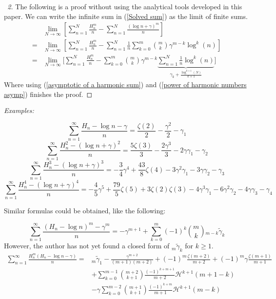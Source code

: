 \documentclass{article}
\newcommand{\pHz}[2]{\mathcal{H}^{#1}(#2)}
\begin{document}
\begin{proof} [\proofname\ 2] The following is a proof without using the analytical tools developed in this paper. We can write the infinite sum in (\ref{Solved sum}) as the limit of finite sums.
    \begin{equation*}\begin{split}&
\lim_{N\to\infty}\left[\sum_{n=1}^N\frac{H^m_n}{n}-\sum_{n=1}^N\frac{(\log n+\gamma)^m}{n}\right]\\ =& \lim_{N\to\infty}\left[\sum_{n=1}^N\frac{H^m_n}{n}-\sum_{n=1}^N\frac{1}{n}\sum_{k=0}^m\binom{m}{k}\gamma^{m-k}\log^k(n)\right] \\
= & \lim_{N\to\infty}\Bigg[\sum_{n=1}^N\frac{H^m_n}{n}-\sum_{k=0}^m\binom{m}{k}\gamma^{m-k}{\underbrace{\sum_{n=1}^N\frac{1}{n}\log^k(n)}_{\gamma_k+\frac{\log^{k+1}(N)}{k+1}}}\Bigg]
\end{split}\end{equation*}
Where using (\ref{asymptotic of a harmonic sum}) and (\ref{power of harmonic numbers asymp}) finishes the proof.
\end{proof}



\textit{Examples:}

$$ \sum_{n=1}^{\infty}\frac{H_n-\log n-\gamma}{n}=\frac{\zeta(2)}{2}-\frac{\gamma^2}{2}-\gamma_1$$
$$ \sum_{n=1}^{\infty}\frac{H_n^2-(\log n+\gamma)^2}{n}=\frac{5\zeta(3)}{3}-\frac{2\gamma^3}{3}-2\gamma\gamma_1-\gamma_2$$
$$ \sum_{n=1}^{\infty}\frac{H_n^3-(\log n+\gamma)^3}{n}=-\frac{3}{4}\gamma^4+\frac{43}{8}\zeta(4)-3\gamma^2\gamma_1-3\gamma\gamma_2-\gamma_3$$
$$ \sum_{n=1}^{\infty}\frac{H_n^4-(\log n+\gamma)^4}{n}=-\frac{4}{5}\gamma^5+\frac{79}{5}\zeta(5)+3\zeta(2)\zeta(3)-4\gamma^3\gamma_1-6\gamma^2\gamma_2-4\gamma\gamma_3-\gamma_4$$


Similar formulas could be obtained, like the following:

\begin{equation}
    \sum_{n=1}^{\infty}\frac{(H_n-\log n)^m -\gamma^m}{n}=-\gamma^{m+1}+\sum_{k=0}^{m}(-1)^k\binom{m}{k}{}_{m-k}\tilde\gamma_k
\end{equation}
However, the author has not yet found a closed form of ${}_m\tilde \gamma_k $ for $k\geq 1$.
\begin{equation}\begin{split}
    \sum_{n=1}^{\infty}\frac{H^m_n(H_n-\log n-\gamma)}{n}=& {}_m\tilde\gamma_1 -\frac{\gamma^{m+2}}{(m+1)(m+2)}+(-1)^m\frac{\zeta(m+2)}{m+2}+(-1)^m \gamma \frac{\zeta(m+1)}{m+1}\\ & +\sum_{k=0}^{m-1}\binom{m+2}{k+1}\frac{(-1)^{k+m+1}}{m+2}\mathcal{H}^{k+1}(m+1-k)\\ & -\gamma \sum_{k=0}^{m-2}\binom{m+1}{k+1} \frac{(-1)^{k+m}}{m+1}\pHz{k+1}{m-k}
\end{split}\end{equation}
\end{document}
